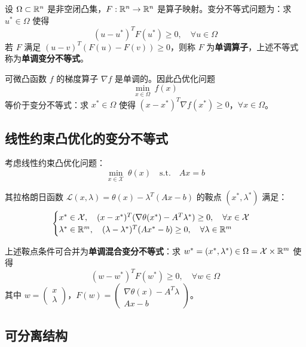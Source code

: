\begin{definition}[变分不等式（VI）]
设 $\Omega \subset \mathbb{R}^n$ 是非空闭凸集，$F: \mathbb{R}^n \to \mathbb{R}^n$ 是算子映射。变分不等式问题为：求 $u^* \in \Omega$ 使得
\[
(u - u^*)^T F(u^*) \geq 0,\quad \forall u \in \Omega
\]
若 $F$ 满足 $(u - v)^T(F(u) - F(v)) \geq 0$，则称 $F$ 为\textbf{单调算子}，上述不等式称为\textbf{单调变分不等式}。
\end{definition}

\begin{property}[凸函数与变分不等式]
可微凸函数 $f$ 的梯度算子 $\nabla f$ 是单调的。因此凸优化问题
\[
\min_{x \in \Omega}\ f(x)
\]
等价于变分不等式：求 $x^* \in \Omega$ 使得 $(x - x^*)^T \nabla f(x^*) \geq 0$，$\forall x \in \Omega$。
\end{property}

\subsection{线性约束凸优化的变分不等式}

考虑线性约束凸优化问题：
\[
\min_{x \in \mathcal{X}}\ \theta(x)\quad \text{s.t.}\quad Ax = b
\]

其拉格朗日函数 $\mathcal{L}(x, \lambda) = \theta(x) - \lambda^T(Ax - b)$ 的鞍点 $(x^*, \lambda^*)$ 满足：
\[
\begin{cases}
x^* \in \mathcal{X},\quad (x - x^*)^T(\nabla \theta(x^*) - A^T \lambda^*) \geq 0,\quad \forall x \in \mathcal{X} \\
\lambda^* \in \mathbb{R}^m,\quad (\lambda - \lambda^*)^T(Ax^* - b) \geq 0,\quad \forall \lambda \in \mathbb{R}^m
\end{cases}
\]

\begin{theorem}[等价变分不等式]
上述鞍点条件可合并为\textbf{单调混合变分不等式}：求 $w^* = (x^*, \lambda^*) \in \Omega = \mathcal{X} \times \mathbb{R}^m$ 使得
\[
(w - w^*)^T F(w^*) \geq 0,\quad \forall w \in \Omega
\]
其中 $w = \begin{pmatrix} x \\ \lambda \end{pmatrix}$，$F(w) = \begin{pmatrix} \nabla \theta(x) - A^T \lambda \\ Ax - b \end{pmatrix}$。
\end{theorem}

\subsection{可分离结构}

